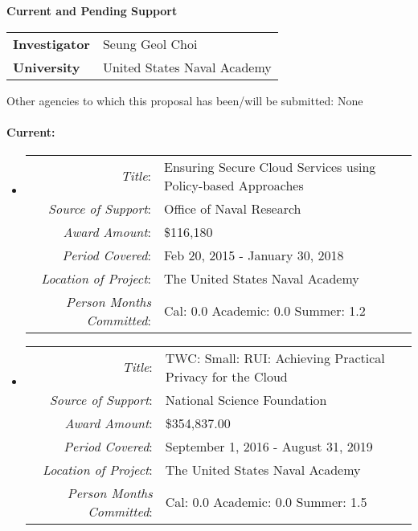 \documentclass[10pt]{article}
\begin{document}
\begin{center}
{\Large \bf Current and Pending Support}\\
\end{center}

\begin{tabular}{l l}
{\bf Investigator} & Seung Geol Choi\\
{\bf University} & United States Naval Academy\\
\end{tabular}

\vspace{.25in}
Other agencies to which this proposal has been/will be submitted: None\\


\paragraph{Current:} 

\begin{itemize}
\item[]
  \begin{tabular} {r l}
    {\em Title}: & Ensuring Secure Cloud Services using Policy-based Approaches\\
    {\em Source of Support}: & Office of Naval Research\\
    {\em Award Amount}: & \$116,180\\
    {\em Period Covered}: & Feb 20, 2015 - January 30, 2018\\
    {\em Location of Project}: & The United States Naval Academy \\
    {\em Person Months Committed}: & Cal: 0.0 Academic: 0.0 Summer: 1.2\\
  \end{tabular}
\item[]
  \begin{tabular} {r l}
    {\em Title}: & TWC: Small: RUI: Achieving Practical Privacy for the
    Cloud \\
    {\em Source of Support}: & National Science Foundation \\
    {\em Award Amount}: & \$354,837.00\\
    {\em Period Covered}: & September 1, 2016 - August 31, 2019\\
    {\em Location of Project}: & The United States Naval Academy \\
    {\em Person Months Committed}: & Cal: 0.0 Academic: 0.0 Summer: 1.5\\
  \end{tabular}

 
\end{itemize}
\end{document}
